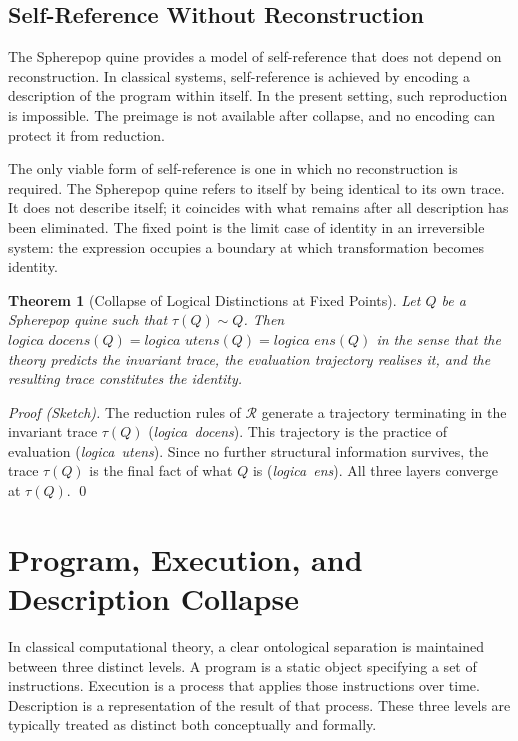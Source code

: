 \documentclass[12pt, oneside]{amsbook}
\theoremstyle{plain}
\newtheorem{theorem}{Theorem}[section]
\theoremstyle{definition}
\theoremstyle{remark}
\newcommand{\trace}{\tau}
\newcommand{\tequiv}{\sim}
\newcommand{\ruleR}{\mathcal{R}}
\newcommand{\docens}{\textit{logica~docens}}
\newcommand{\utens}{\textit{logica~utens}}
\newcommand{\ens}{\textit{logica~ens}}
\begin{document}
\section{Self-Reference Without Reconstruction}
\label{sec:fixedpoints:selfref}

The Spherepop quine provides a model of self-reference that does not depend on
reconstruction. In classical systems, self-reference is achieved by encoding a
description of the program within itself. In the present setting, such
reproduction is impossible. The preimage is not available after collapse, and
no encoding can protect it from reduction.

The only viable form of self-reference is one in which no reconstruction is
required. The Spherepop quine refers to itself by being identical to its own
trace. It does not describe itself; it coincides with what remains after all
description has been eliminated. The fixed point is the limit case of identity
in an irreversible system: the expression occupies a boundary at which
transformation becomes identity.

\begin{theorem}[Collapse of Logical Distinctions at Fixed Points]
\label{thm:triple-collapse}
  Let $Q$ be a Spherepop quine such that $\trace(Q) \tequiv Q$. Then
  $\docens{}(Q) = \utens{}(Q) = \ens{}(Q)$ in the sense that the theory
  predicts the invariant trace, the evaluation trajectory realises it, and the
  resulting trace constitutes the identity.
\end{theorem}

\begin{proof}[Proof (Sketch)]
The reduction rules of $\ruleR$ generate a trajectory terminating in the
invariant trace $\trace(Q)$ (\docens{}). This trajectory is the practice of
evaluation (\utens{}). Since no further structural information survives, the
trace $\trace(Q)$ is the final fact of what $Q$ is (\ens{}). All three layers
converge at $\trace(Q)$. \qed
\end{proof}

\chapter{Program, Execution, and Description Collapse}
\label{ch:pec}

In classical computational theory, a clear ontological separation is maintained
between three distinct levels. A program is a static object specifying a set of
instructions. Execution is a process that applies those instructions over time.
Description is a representation of the result of that process. These three
levels are typically treated as distinct both conceptually and formally.
\end{document}
